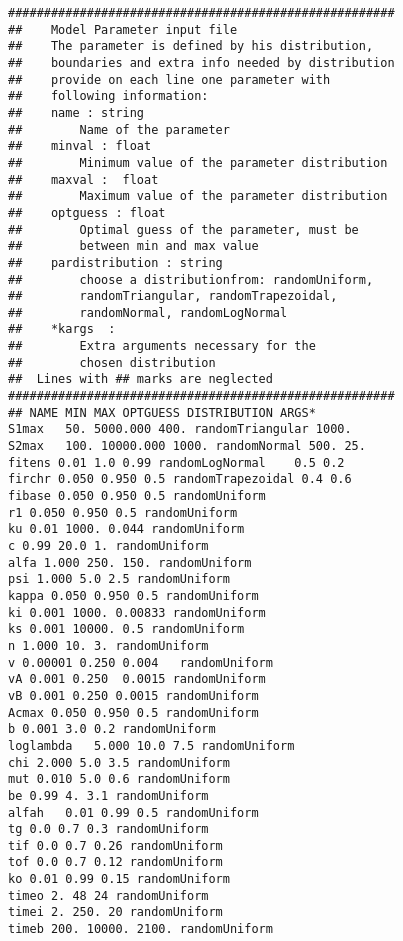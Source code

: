 \begin{lstlisting}[frame=single,columns=fixed]
######################################################
##    Model Parameter input file
##    The parameter is defined by his distribution,
##    boundaries and extra info needed by distribution 
##    provide on each line one parameter with 
##    following information:
##    name : string
##        Name of the parameter
##    minval : float
##        Minimum value of the parameter distribution
##    maxval :  float
##        Maximum value of the parameter distribution
##    optguess : float
##        Optimal guess of the parameter, must be 
##        between min and max value
##    pardistribution : string
##        choose a distributionfrom: randomUniform,
##        randomTriangular, randomTrapezoidal, 
##        randomNormal, randomLogNormal
##    *kargs  :
##        Extra arguments necessary for the 
##        chosen distribution
##	Lines with ## marks are neglected
######################################################
## NAME	MIN MAX OPTGUESS DISTRIBUTION ARGS*
S1max	50. 5000.000 400. randomTriangular 1000.
S2max	100. 10000.000 1000. randomNormal 500. 25. 
fitens 0.01 1.0 0.99 randomLogNormal	0.5 0.2
firchr 0.050 0.950 0.5 randomTrapezoidal 0.4 0.6
fibase 0.050 0.950 0.5 randomUniform
r1 0.050 0.950 0.5 randomUniform
ku 0.01 1000. 0.044 randomUniform
c 0.99 20.0 1. randomUniform
alfa 1.000 250. 150. randomUniform
psi 1.000 5.0 2.5 randomUniform
kappa 0.050 0.950 0.5 randomUniform
ki 0.001 1000. 0.00833 randomUniform
ks 0.001 10000. 0.5 randomUniform
n 1.000 10. 3. randomUniform
v 0.00001 0.250 0.004	randomUniform
vA 0.001 0.250	0.0015 randomUniform
vB 0.001 0.250 0.0015 randomUniform
Acmax 0.050 0.950 0.5 randomUniform
b 0.001 3.0 0.2 randomUniform
loglambda	5.000 10.0 7.5 randomUniform
chi 2.000 5.0 3.5 randomUniform
mut 0.010 5.0 0.6 randomUniform
be 0.99 4. 3.1 randomUniform
alfah	0.01 0.99 0.5 randomUniform
tg 0.0 0.7 0.3 randomUniform
tif 0.0 0.7 0.26 randomUniform
tof 0.0 0.7 0.12 randomUniform
ko 0.01 0.99 0.15 randomUniform
timeo 2. 48 24 randomUniform
timei 2. 250. 20 randomUniform
timeb 200. 10000. 2100. randomUniform
\end{lstlisting}